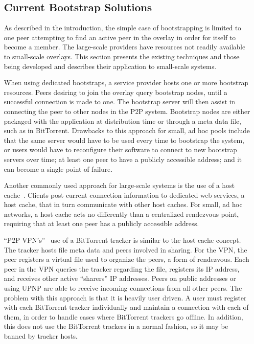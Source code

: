 \documentclass[conference]{IEEEtran}
\begin{document}
\subsection{Current Bootstrap Solutions}

As described in the introduction, the simple case of bootstrapping is limited
to one peer attempting to find an active peer in the overlay in order for
itself to become a member.  The large-scale providers have resources not
readily available to small-scale overlays.  This section presents the existing
techniques and those being developed and describes their application to
small-scale systems.

When using dedicated bootstraps, a service provider hosts one or more bootstrap
resources.  Peers desiring to join the overlay query bootstrap nodes, until a
successful connection is made to one.  The bootstrap server will then assist in
connecting the peer to other nodes in the P2P system.  Bootstrap nodes are
either packaged with the application at distribution time or through a meta
data file, such as in BitTorrent.  Drawbacks to this approach for small, ad hoc
pools include that the same server would have to be used every time to
bootstrap the system, or users would have to reconfigure their software to
connect to new bootstrap servers over time; at least one peer to have a
publicly accessible address; and it can become a single point of failure.

Another commonly used approach for large-scale systems is the use of a host
cache~\cite{host_cache}.  Clients post current connection information to
dedicated web services, a host cache, that in turn communicate with other host
caches.  For small, ad hoc networks, a host cache acts no differently than a
centralized rendezvous point, requiring that at least one peer has a publicly
accessible address.

``P2P VPN's''~\cite{p2pvpn} use of a BitTorrent tracker is similar to the host
cache concept.  The tracker hosts file meta data and peers involved in sharing.
For the VPN, the peer registers a virtual file used to organize the peers, a
form of rendezvous.  Each peer in the VPN queries the tracker regarding the
file, registers its IP address, and receives other active ``sharers'' IP
addresses.  Peers on public addresses or using UPNP are able to receive
incoming connections from all other peers.  The problem with this approach is
that it is heavily user driven.  A user must register with each BitTorrent
tracker individually and maintain a connection with each of them, in order to
handle cases where BitTorrent trackers go offline.  In addition, this does not
use the BitTorrent trackers in a normal fashion, so it may be banned by tracker
hosts.
\end{document}
